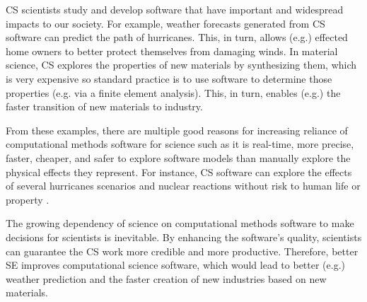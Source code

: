 \documentclass[sigconf,review,anonymous]{acmart}
\begin{document}
CS scientists study and develop software that have important and widespread impacts to our society.  
For example, weather forecasts generated from CS
software can  predict the path of hurricanes. This, in turn,
allows (e.g.) effected home owners to better protect themselves from
damaging winds. In material science, CS explores the properties
of new materials by synthesizing them, which is very expensive so standard practice is to use software to determine
those properties (e.g. via a finite element analysis). This, in turn, enables (e.g.) the faster transition of new materials to industry.

From these examples, there are multiple good reasons for increasing reliance of computational methods software for science such as it is real-time, more precise, faster, cheaper, and safer to 
explore software models than manually explore the physical effects they represent. For instance, CS software can explore the effects of several 
hurricanes 
scenarios and nuclear reactions without risk to  human  life
or property \cite{heaton15_lit}. 

The growing dependency of science on computational methods software to make decisions for scientists is inevitable. By enhancing the software's quality, scientists can guarantee the CS work more credible and more productive. Therefore, 
better SE improves computational
science software, which would lead to better (e.g.) weather  prediction and the faster creation of new industries based on new materials.


 


 

\end{document}
